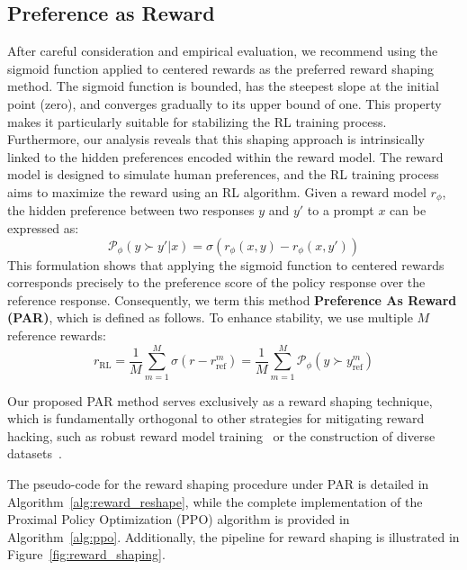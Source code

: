 \subsection{Preference as Reward}
After careful consideration and empirical evaluation, we recommend using the sigmoid function applied to centered rewards as the preferred reward shaping method. The sigmoid function is bounded, has the steepest slope at the initial point (zero), and converges gradually to its upper bound of one. This property makes it particularly suitable for stabilizing the RL training process.
Furthermore, our analysis reveals that this shaping approach is intrinsically linked to the hidden preferences encoded within the reward model. The reward model is designed to simulate human preferences, and the RL training process aims to maximize the reward using an RL algorithm. Given a reward model \( r_{\phi} \), the hidden preference between two responses \( y \) and \( y' \) to a prompt \( x \) can be expressed as:
\[
\mathcal{P}_{\phi}(y \succ y' | x) = \sigma(r_{\phi}(x, y) - r_{\phi}(x, y'))
\]
This formulation shows that applying the sigmoid function to centered rewards corresponds precisely to the preference score of the policy response over the reference response. Consequently, we term this method \textbf{Preference As Reward (PAR)}, which is defined as follows. To enhance stability, we use multiple $M$ reference rewards:
\[
r_{\text{RL}} = \frac{1}{M}\sum_{m=1}^M \sigma(r - r_{\text{ref}}^m) = \frac{1}{M}\sum_{m=1}^M \mathcal{P}_{\phi}(y \succ y_{\text{ref}}^m)
\]

Our proposed PAR method serves exclusively as a reward shaping technique, which is fundamentally orthogonal to other strategies for mitigating reward hacking, such as robust reward model training~\citep{Dai2023SafeRS} or the construction of diverse datasets~\cite{liu2024rrmrobustrewardmodel}.

The pseudo-code for the reward shaping procedure under PAR is detailed in Algorithm~\ref{alg:reward_reshape}, while the complete implementation of the Proximal Policy Optimization (PPO) algorithm is provided in Algorithm~\ref{alg:ppo}. Additionally, the pipeline for reward shaping is illustrated in Figure~\ref{fig:reward_shaping}.